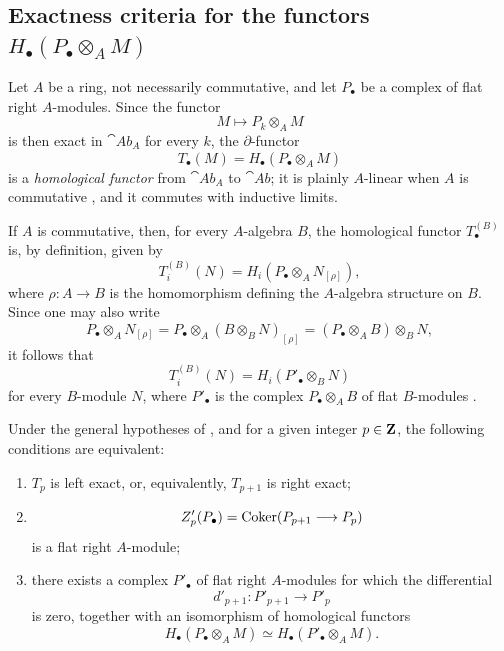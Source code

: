\subsection{\texorpdfstring{Exactness criteria for the functors
$H_\bullet(P_\bullet\otimes_A M)$}{Exactness criteria for the functors H.(P. tensor M)}}
\label{subsection:III.7.4}
\label{III.7.4}

\begin{env}[7.4.1]
\label{III.7.4.1}
Let $A$ be a ring, not necessarily commutative, and let
$P_\bullet$ be a complex of flat right $A$-modules.  Since the
functor
\[
  M\longmapsto P_k\otimes_A M
\]
is then exact in $\cat{Ab}_A$ for every $k$, the
$\partial$-functor
\[
  T_\bullet(M)=H_\bullet(P_\bullet\otimes_A M)
  \tag{7.4.1.1}\label{III.7.4.1.1.eq}
\]
is a \emph{homological functor} from $\cat{Ab}_A$ to
$\cat{Ab}$; it is plainly $A$-linear when $A$ is commutative
, and it commutes with inductive limits.

If $A$ is commutative, then, for every $A$-algebra $B$, the
homological functor $T_\bullet^{(B)}$  is, by
definition, given by
\[
  T_i^{(B)}(N)
  =
  H_i(P_\bullet\otimes_A N_{[\rho]}),
  \tag{7.4.1.2}\label{III.7.4.1.2.eq}
\]
where $\rho:A\to B$ is the homomorphism defining the
$A$-algebra structure on $B$.  Since one may also write
\[
  P_\bullet\otimes_A N_{[\rho]}
  =
  P_\bullet\otimes_A(B\otimes_B N)_{[\rho]}
  =
  (P_\bullet\otimes_A B)\otimes_B N,
\]
it follows that
\[
  T_i^{(B)}(N)
  =
  H_i(P'_\bullet\otimes_B N)
  \tag{7.4.1.3}\label{III.7.4.1.3.eq}
\]
for every $B$-module $N$, where $P'_\bullet$ is the complex
$P_\bullet\otimes_A B$ of flat $B$-modules
.
\end{env}

\begin{proposition}[7.4.2]
\label{III.7.4.2}
Under the general hypotheses of , and for a
given integer $p\in\mathbf{Z}$, the following conditions are
equivalent:
\begin{enumerate}
  \item[(a)] $T_p$ is left exact, or, equivalently,
    $T_{p+1}$ is right exact;
  \item[(b)]
    \[
      Z'_p(P_\bullet)
      =
      \operatorname{Coker}(P_{p+1}\longrightarrow P_p)
    \]
    is a flat right $A$-module;
  \item[(c)] there exists a complex $P'_\bullet$ of flat right
    $A$-modules for which the differential
    \[
      d'_{p+1}:P'_{p+1}\longrightarrow P'_p
    \]
    is zero, together with an isomorphism of homological
    functors
    \[
      H_\bullet(P_\bullet\otimes_A M)
      \simeq
      H_\bullet(P'_\bullet\otimes_A M).
    \]
\end{enumerate}
\end{proposition}

